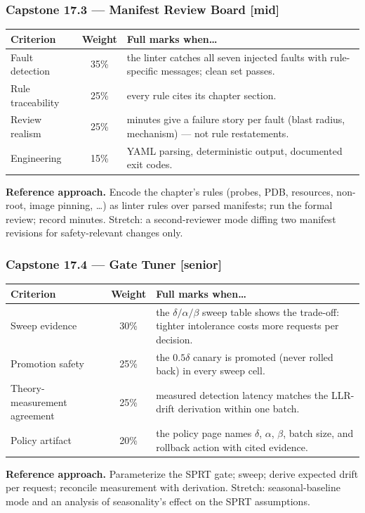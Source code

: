 \subsubsection*{Capstone 17.3 --- Manifest Review Board [mid]}
\begin{center}\small
\begin{tabularx}{\textwidth}{l c X}
\toprule
\textbf{Criterion} & \textbf{Weight} & \textbf{Full marks when\ldots} \\
\midrule
Fault detection & 35\% & the linter catches all seven injected faults with rule-specific messages; clean set passes. \\
Rule traceability & 25\% & every rule cites its chapter section. \\
Review realism & 25\% & minutes give a failure story per fault (blast radius, mechanism) --- not rule restatements. \\
Engineering & 15\% & YAML parsing, deterministic output, documented exit codes. \\
\bottomrule
\end{tabularx}
\end{center}
\textbf{Reference approach.} Encode the chapter's rules (probes, PDB,
resources, non-root, image pinning, \ldots) as linter rules over parsed
manifests; run the formal review; record minutes. Stretch: a second-reviewer
mode diffing two manifest revisions for safety-relevant changes only.

\subsubsection*{Capstone 17.4 --- Gate Tuner [senior]}
\begin{center}\small
\begin{tabularx}{\textwidth}{l c X}
\toprule
\textbf{Criterion} & \textbf{Weight} & \textbf{Full marks when\ldots} \\
\midrule
Sweep evidence & 30\% & the $\delta/\alpha/\beta$ sweep table shows the trade-off: tighter intolerance costs more requests per decision. \\
Promotion safety & 25\% & the $0.5\delta$ canary is promoted (never rolled back) in every sweep cell. \\
Theory-measurement agreement & 25\% & measured detection latency matches the LLR-drift derivation within one batch. \\
Policy artifact & 20\% & the policy page names $\delta$, $\alpha$, $\beta$, batch size, and rollback action with cited evidence. \\
\bottomrule
\end{tabularx}
\end{center}
\textbf{Reference approach.} Parameterize the SPRT gate; sweep; derive
expected drift per request; reconcile measurement with derivation. Stretch:
seasonal-baseline mode and an analysis of seasonality's effect on the SPRT
assumptions.


